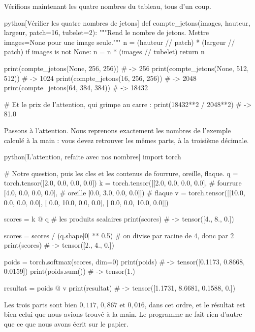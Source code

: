 Vérifions maintenant les quatre nombres du tableau, tous d'un coup.

\begin{code}{python}[Vérifier les quatre nombres de jetons]
def compte_jetons(images, hauteur, largeur, patch=16, tubelet=2):
    """Rend le nombre de jetons. Mettre images=None pour une image seule."""
    n = (hauteur // patch) * (largeur // patch)
    if images is not None:
        n = n * (images // tubelet)
    return n

print(compte_jetons(None, 256, 256))   # -> 256
print(compte_jetons(None, 512, 512))   # -> 1024
print(compte_jetons(16,  256, 256))    # -> 2048
print(compte_jetons(64,  384, 384))    # -> 18432

# Et le prix de l'attention, qui grimpe au carre :
print(18432**2 / 2048**2)              # -> 81.0
\end{code}

Passons à l'attention. Nous reprenons exactement les nombres de l'exemple
calculé à la main : vous devez retrouver les mêmes parts, à la troisième
décimale.

\begin{code}{python}[L'attention, refaite avec nos nombres]
import torch

# Notre question, puis les cles et les contenus de fourrure, oreille, flaque.
q = torch.tensor([2.0, 0.0, 0.0, 0.0])
k = torch.tensor([[2.0, 0.0, 0.0, 0.0],    # fourrure
                  [4.0, 0.0, 0.0, 0.0],    # oreille
                  [0.0, 3.0, 0.0, 0.0]])   # flaque
v = torch.tensor([[10.0,  0.0,  0.0, 0.0],
                  [ 0.0, 10.0,  0.0, 0.0],
                  [ 0.0,  0.0, 10.0, 0.0]])

scores = k @ q                      # les produits scalaires
print(scores)                       # -> tensor([4., 8., 0.])

scores = scores / (q.shape[0] ** 0.5)   # on divise par racine de 4, donc par 2
print(scores)                       # -> tensor([2., 4., 0.])

poids = torch.softmax(scores, dim=0)
print(poids)                        # -> tensor([0.1173, 0.8668, 0.0159])
print(poids.sum())                  # -> tensor(1.)

resultat = poids @ v
print(resultat)                     # -> tensor([1.1731, 8.6681, 0.1588, 0.])
\end{code}
Les trois parts sont bien $0{,}117$, $0{,}867$ et $0{,}016$, dans cet ordre,
et le résultat est bien celui que nous avions trouvé à la main. Le programme
ne fait rien d'autre que ce que nous avons écrit sur le papier.


